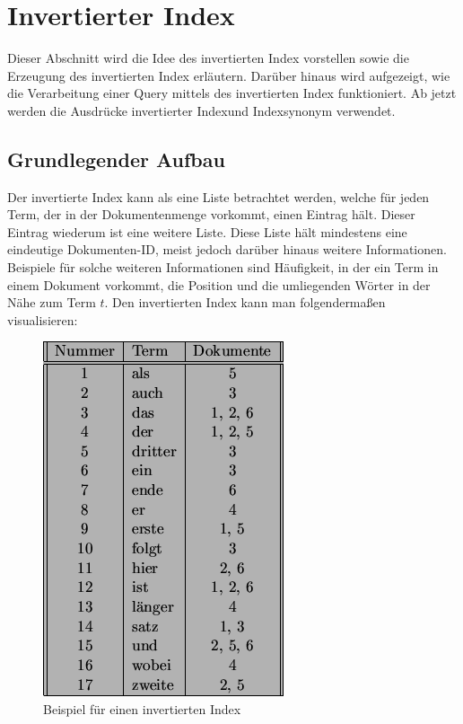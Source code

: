 \section{Invertierter Index}
Dieser Abschnitt wird die Idee des invertierten Index vorstellen sowie die Erzeugung des invertierten Index erläutern. Darüber hinaus wird aufgezeigt, wie die Verarbeitung einer Query mittels des invertierten Index funktioniert. Ab jetzt werden die Ausdrücke \glqq invertierter Index\grqq und \glqq Index\grqq synonym verwendet.
\subsection{Grundlegender Aufbau}
Der invertierte Index kann als eine Liste betrachtet werden, welche für jeden Term, der in der Dokumentenmenge vorkommt, einen Eintrag hält. Dieser Eintrag wiederum ist eine weitere Liste. Diese Liste hält mindestens eine eindeutige Dokumenten-ID, meist jedoch darüber hinaus weitere Informationen. Beispiele für solche weiteren Informationen sind Häufigkeit, in der ein Term in einem Dokument vorkommt, die Position und die umliegenden Wörter in der Nähe zum Term $t$.
\newline
Den invertierten Index kann man folgendermaßen visualisieren:
\begin{figure}[H]
	\centering
	\includegraphics[scale=0.5]{../Abbildungen/index.png}
	\caption{Beispiel für einen invertierten Index}
\end{figure}